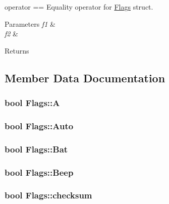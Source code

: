 operator == Equality operator for \hyperlink{struct_flags}{Flags} struct. 


\begin{DoxyParams}{Parameters}
{\em f1} & \\
\hline
{\em f2} & \\
\hline
\end{DoxyParams}
\begin{DoxyReturn}{Returns}

\end{DoxyReturn}


\subsection{Member Data Documentation}
\hypertarget{struct_flags_a077d7fc9ad4328f5be164385e55ce9b2}{
\subsubsection[{A}]{\setlength{\rightskip}{0pt plus 5cm}bool Flags\-::\-A}}\label{struct_flags_a077d7fc9ad4328f5be164385e55ce9b2}
\hypertarget{struct_flags_a66049934037142a256e50de8e0495266}{
\subsubsection[{Auto}]{\setlength{\rightskip}{0pt plus 5cm}bool Flags\-::\-Auto}}\label{struct_flags_a66049934037142a256e50de8e0495266}
\hypertarget{struct_flags_a7dac4dca6fd0931b47ebf9a02f9fb700}{
\subsubsection[{Bat}]{\setlength{\rightskip}{0pt plus 5cm}bool Flags\-::\-Bat}}\label{struct_flags_a7dac4dca6fd0931b47ebf9a02f9fb700}
\hypertarget{struct_flags_ac01b592426c267d0c23a9fd1455664e5}{
\subsubsection[{Beep}]{\setlength{\rightskip}{0pt plus 5cm}bool Flags\-::\-Beep}}\label{struct_flags_ac01b592426c267d0c23a9fd1455664e5}
\hypertarget{struct_flags_a08dfc32619ad6bfb8c99c1276e697926}{
\subsubsection[{checksum}]{\setlength{\rightskip}{0pt plus 5cm}bool Flags\-::checksum}}\label{struct_flags_a08dfc32619ad6bfb8c99c1276e697926}
